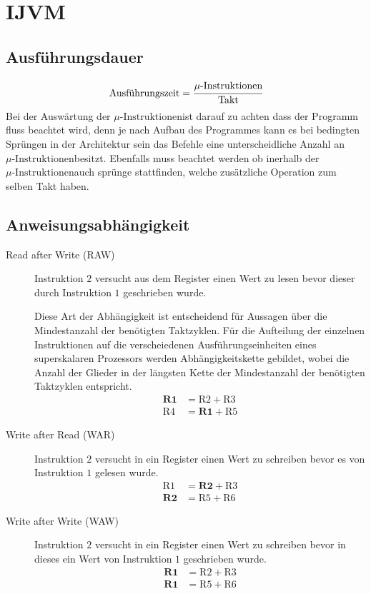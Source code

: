 \newcommand{\microinst}{\ensuremath{\mu\text{-Instruktionen}}}

\section{IJVM}

\subsection{Ausführungsdauer}
\[
 \text{Ausführungszeit} = \cfrac{\microinst}{\text{Takt}}
\]
\important Bei der Auswärtung der \microinst ist darauf zu achten dass der Programm 
fluss beachtet wird, denn je nach Aufbau des Programmes kann es bei bedingten Sprüngen
in der Architektur sein das Befehle eine unterscheidliche Anzahl an \microinst besitzt. 
Ebenfalls muss beachtet werden ob inerhalb der \microinst auch sprünge stattfinden,
welche zusätzliche Operation zum selben Takt haben.

\subsection{Anweisungsabhängigkeit}
\begin{description}
 \item[Read after Write (RAW)]
 Instruktion $2$ versucht aus dem Register einen Wert zu lesen bevor dieser durch
 Instruktion $1$ geschrieben wurde. \par
 Diese Art der Abhängigkeit ist entscheidend für Aussagen über die Mindestanzahl
 der benötigten Taktzyklen. Für die Aufteilung der einzelnen Instruktionen auf die
 verscheiedenen Ausführungseinheiten eines superskalaren Prozessors werden 
 Abhängigkeitskette gebildet, wobei die Anzahl der Glieder in der längsten Kette
 der Mindestanzahl der benötigten Taktzyklen entspricht.
 \begin{align}
 \textbf{R1} &= \text{R2} + \text{R3} \\
 \text{R4} &= \textbf{R1} + \text{R5}
 \end{align}
 \setcounter{equation}{0}
 
 \item[Write after Read (WAR)]
 Instruktion $2$ versucht in ein Register einen Wert zu schreiben bevor es von
 Instruktion $1$ gelesen wurde.
 \begin{align}
 \text{R1} &= \textbf{R2} + \text{R3} \\
 \textbf{R2} &= \text{R5} + \text{R6}
 \end{align}
 \setcounter{equation}{0}

 \item[Write after Write (WAW)]
 Instruktion $2$ versucht in ein Register einen Wert zu schreiben bevor in dieses
 ein Wert von Instruktion $1$ geschrieben wurde.
 \begin{align}
 \textbf{R1} &= \text{R2} + \text{R3} \\
 \textbf{R1} &= \text{R5} + \text{R6}
 \end{align}
 \setcounter{equation}{0}
\end{description}

